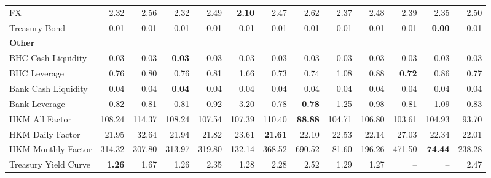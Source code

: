 \begin{tabular}{@{}lrrrrrrrrrrrr@{}}
FX & 2.32 & 2.56 & 2.32 & 2.49 & \textbf{2.10} & 2.47 & 2.62 & 2.37 & 2.48 & 2.39 & 2.35 & 2.50 \\
Treasury Bond & 0.01 & 0.01 & 0.01 & 0.01 & 0.01 & 0.01 & 0.01 & 0.01 & 0.01 & 0.01 & \textbf{0.00} & 0.01 \\
\midrule
\multicolumn{13}{l}{\textbf{Other}} \\
BHC Cash Liquidity & 0.03 & 0.03 & \textbf{0.03} & 0.03 & 0.03 & 0.03 & 0.03 & 0.03 & 0.03 & 0.03 & 0.03 & 0.03 \\
BHC Leverage & 0.76 & 0.80 & 0.76 & 0.81 & 1.66 & 0.73 & 0.74 & 1.08 & 0.88 & \textbf{0.72} & 0.86 & 0.77 \\
Bank Cash Liquidity & 0.04 & 0.04 & \textbf{0.04} & 0.04 & 0.04 & 0.04 & 0.04 & 0.04 & 0.04 & 0.04 & 0.04 & 0.04 \\
Bank Leverage & 0.82 & 0.81 & 0.81 & 0.92 & 3.20 & 0.78 & \textbf{0.78} & 1.25 & 0.98 & 0.81 & 1.09 & 0.83 \\
HKM All Factor & 108.24 & 114.37 & 108.24 & 107.54 & 107.39 & 110.40 & \textbf{88.88} & 104.71 & 106.80 & 103.61 & 104.93 & 93.70 \\
HKM Daily Factor & 21.95 & 32.64 & 21.94 & 21.82 & 23.61 & \textbf{21.61} & 22.10 & 22.53 & 22.14 & 27.03 & 22.34 & 22.01 \\
HKM Monthly Factor & 314.32 & 307.80 & 313.97 & 319.80 & 132.14 & 368.52 & 690.52 & 81.60 & 196.26 & 471.50 & \textbf{74.44} & 238.28 \\
Treasury Yield Curve & \textbf{1.26} & 1.67 & 1.26 & 2.35 & 1.28 & 2.28 & 2.52 & 1.29 & 1.27 & -- & -- & 2.47 \\
\bottomrule
\end{tabular}